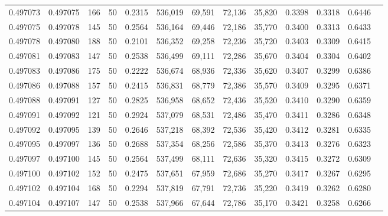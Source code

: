 \begin{tabular}{rrrrrrrrrrrrr}
0.497073 & 0.497075 &   166 &  50 &                                     0.2315 & 536,019 &  69,591 &  72,136 &  35,820 & 0.3398 & 0.3318 & 0.6446 \\
0.497075 & 0.497078 &   145 &  50 &                                     0.2564 & 536,164 &  69,446 &  72,186 &  35,770 & 0.3400 & 0.3313 & 0.6433 \\
0.497078 & 0.497080 &   188 &  50 &                                     0.2101 & 536,352 &  69,258 &  72,236 &  35,720 & 0.3403 & 0.3309 & 0.6415 \\
0.497081 & 0.497083 &   147 &  50 &                                     0.2538 & 536,499 &  69,111 &  72,286 &  35,670 & 0.3404 & 0.3304 & 0.6402 \\
0.497083 & 0.497086 &   175 &  50 &                                     0.2222 & 536,674 &  68,936 &  72,336 &  35,620 & 0.3407 & 0.3299 & 0.6386 \\
0.497086 & 0.497088 &   157 &  50 &                                     0.2415 & 536,831 &  68,779 &  72,386 &  35,570 & 0.3409 & 0.3295 & 0.6371 \\
0.497088 & 0.497091 &   127 &  50 &                                     0.2825 & 536,958 &  68,652 &  72,436 &  35,520 & 0.3410 & 0.3290 & 0.6359 \\
0.497091 & 0.497092 &   121 &  50 &                                     0.2924 & 537,079 &  68,531 &  72,486 &  35,470 & 0.3411 & 0.3286 & 0.6348 \\
0.497092 & 0.497095 &   139 &  50 &                                     0.2646 & 537,218 &  68,392 &  72,536 &  35,420 & 0.3412 & 0.3281 & 0.6335 \\
0.497095 & 0.497097 &   136 &  50 &                                     0.2688 & 537,354 &  68,256 &  72,586 &  35,370 & 0.3413 & 0.3276 & 0.6323 \\
0.497097 & 0.497100 &   145 &  50 &                                     0.2564 & 537,499 &  68,111 &  72,636 &  35,320 & 0.3415 & 0.3272 & 0.6309 \\
0.497100 & 0.497102 &   152 &  50 &                                     0.2475 & 537,651 &  67,959 &  72,686 &  35,270 & 0.3417 & 0.3267 & 0.6295 \\
0.497102 & 0.497104 &   168 &  50 &                                     0.2294 & 537,819 &  67,791 &  72,736 &  35,220 & 0.3419 & 0.3262 & 0.6280 \\
0.497104 & 0.497107 &   147 &  50 &                                     0.2538 & 537,966 &  67,644 &  72,786 &  35,170 & 0.3421 & 0.3258 & 0.6266 \\

\end{tabular}
